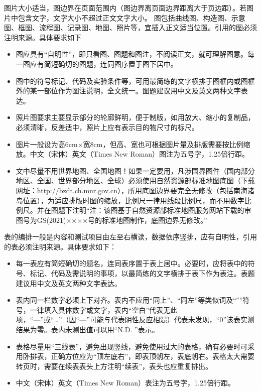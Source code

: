 图片大小适当，图边界在页面范围内（图边界离页面边界距离大于页边距）。若图片中包含文字，文字大小不超过正文文字大小。
图包括曲线图、构造图、示意图、框图、流程图、记录图、地图、照片等，宜插入正文适当位置。引用的图必须注明来源。具体要求如下
\begin{itemize}
    \item 图应具有“自明性”，即只看图、图题和图注，不阅读正文，就可理解图意。每一图应有简短确切的图题，连同图序置于图下居中。
    \item 图中的符号标记、代码及实验条件等，可用最简练的文字横排于图框内或图框外的某一部位作为图注说明，全文统一。图题建议用中文及英文两种文字表达。
    \item 照片图要求主要显示部分的轮廓鲜明，便于制版，如用放大、缩小的复制品，必须清晰，反差适中，照片上应有表示目的物尺寸的标尺。
    \item 图片一般设为高6cm×宽8cm，但高、宽也可根据图片量及排版需要按比例缩放。中文（宋体）英文（Times New Roman）图注为五号字，1.25倍行距。
    \item 文中尽量不用世界地图、全国地图！如果一定要用，凡涉国界图件（国内部分地区、全国、世界部分地区、全球）必须使用自然资源部标准地图底图（下载网址：http://bzdt.ch.mnr.gov.cn），所用底图边界要完全无修改（包括南海诸岛位置），为适应排版时图的缩放，比例尺一律用线段比例尺，而不用数字比例尺。并在图题下注明“注：该图基于自然资源部标准地图服务网站下载的审图号为GS(2021)××××号的标准地图制作，底图边界无修改。”
\end{itemize}

表的编排一般是内容和测试项目由左至右横读，数据依序竖排，应有自明性，引用的表必须注明来源。具体要求如下：
\begin{itemize}
    \item 每一表应有简短确切的题名，连同表序置于表上居中。必要时，应将表中的符号、标记、代码及需说明的事项，以最简练的文字横排于表下作为表注。表题建议用中文及英文两种文字表达。
    \item 表内同一栏数字必须上下对齐。表内不应用“同上”、“同左”等类似词及“″”符号，一律填入具体数字或文字，表内“空白”代表无此项，“—”或“…”（因“—”可能与代表阴性反应相混）代表未发现，“0”该表实测结果为零。表内未测出值可以用“N.D. ”表示。
    \item 表格尽量用“三线表”，避免出现竖线，避免使用过大的表格，确有必要时可采用卧排表，正确方位应为“顶左底右”，即表顶朝左，表底朝右。表格太大需要转页时，需要在续表表头上方注明“续表”，表头也应重复排出。
    \item 中文（宋体）英文（Times New Roman）表注为五号字，1.25倍行距。
\end{itemize}

